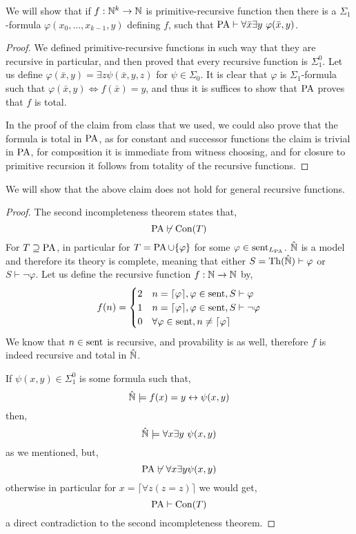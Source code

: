 \question{}
\subquestion{}
We will show that if $f : \mathbb{N}^k \to \mathbb{N}$ is primitive-recursive function then there is a $\Sigma_1$-formula $\varphi(x_0, \ldots, x_{k - 1}, y)$ defining $f$,
such that $\operatorname{PA} \vdash \forall \bar{x} \exists y\ \varphi(\bar{x}, y)$.
\begin{proof}
	We defined primitive-recursive functions in such way that they are recursive in particular, and then proved that every recursive function is $\Sigma_1^0$.
	Let us define $\varphi(\bar{x}, y) = \exists z \psi(\bar{x}, y, z)$ for $\psi \in \Sigma_0$.
	It is clear that $\varphi$ is $\Sigma_1$-formula such that $\varphi(\bar{x}, y) \iff f(\bar{x}) = y$, and thus it is suffices to show that $\operatorname{PA}$ proves that $f$ is total.

	In the proof of the claim from class that we used, we could also prove that the formula is total in $\operatorname{PA}$,
	as for constant and successor functions the claim is trivial in $\operatorname{PA}$, for composition it is immediate from witness choosing, and for closure to primitive recursion it follows from totality of the recursive functions.
\end{proof}

\subquestion{}
We will show that the above claim does not hold for general recursive functions.
\begin{proof}
	The second incompleteness theorem states that,
	\[
		\operatorname{PA} \not\vdash \operatorname{Con}(T)
	\]
	For $T \supseteq \operatorname{PA}$, in particular for $T = \operatorname{PA} \cup \{ \varphi \}$ for some $\varphi \in \operatorname{sent}_{L_{\operatorname{PA}}}$.
	$\hat{\mathbb{N}}$ is a model and therefore its theory is complete, meaning that either $S = \operatorname{Th}(\hat{\mathbb{N}}) \vdash \varphi$ or $S \vdash \lnot \varphi$.
	Let us define the recursive function $f : \mathbb{N} \to \mathbb{N}$ by,
	\[
		f(n)
		= \begin{cases}
			2 & n = \lceil \varphi \rceil, \varphi \in \operatorname{sent}, S \vdash \varphi \\
			1 & n = \lceil \varphi \rceil, \varphi \in \operatorname{sent}, S \vdash \lnot \varphi \\
			0 & \forall \varphi \in \operatorname{sent}, n \ne \lceil \varphi \rceil
		\end{cases}
	\]
	We know that $n \in \operatorname{sent}$ is recursive, and provability is as well, therefore $f$ is indeed recursive and total in $\hat{\mathbb{N}}$.

	If $\psi(x, y) \in \Sigma_1^0$ is some formula such that,
	\[
		\hat{\mathbb{N}}
		\models f(x) = y \leftrightarrow \psi(x, y)
	\]
	then,
	\[
		\hat{\mathbb{N}}
		\models \forall x \exists y\ \psi(x, y)
	\]
	as we mentioned, but,
	\[
		\operatorname{PA}
		\not\vdash \forall x \exists y \psi(x, y)
	\]
	otherwise in particular for $x = \lceil \forall z (z = z) \rceil$ we would get,
	\[
		\operatorname{PA}
		\vdash \operatorname{Con}(T)
	\]
	a direct contradiction to the second incompleteness theorem.
\end{proof}

